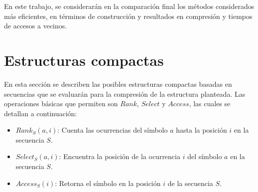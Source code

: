 %
%
%
%


En este trabajo, se considerarán en la comparación final los métodos considerados más eficientes, en términos de construcción y resultados en compresión y tiempos de accesos a vecinos.



\section{Estructuras compactas} \label{sec:compactEstruct}
En esta sección se describen las posibles estructuras compactas basadas en secuencias que se evaluarán para la compresión de la estructura planteada. Las operaciones básicas que permiten son \textbf{$Rank$}, \textbf{$Select$} y \textbf{$Access$}, las cuales se detallan a continuación:

\begin{itemize}
	\item \textbf{$Rank_{S}(a, i)$}: Cuenta las ocurrencias del símbolo $a$ hasta la posición $i$ en la secuencia $S$.
	\item \textbf{$Select_{S}(a, i)$}: Encuentra la posición de la ocurrencia $i$ del símbolo $a$ en la secuencia $S$.
	\item \textbf{$Access_{S}(i)$}: Retorna el símbolo en la posición $i$ de la secuencia $S$.
\end{itemize}

